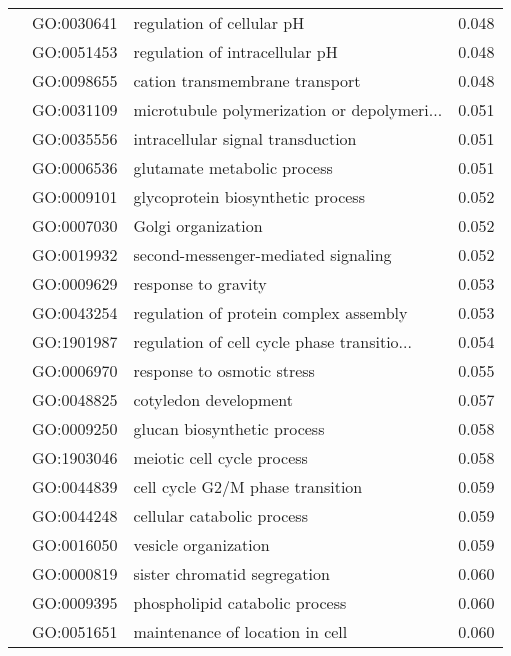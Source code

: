 \begin{longtable}{lllr}
   & GO:0030641 &                    regulation of cellular pH &         0.048 \\
   & GO:0051453 &               regulation of intracellular pH &         0.048 \\
   & GO:0098655 &               cation transmembrane transport &         0.048 \\
   & GO:0031109 &  microtubule polymerization or depolymeri... &         0.051 \\
   & GO:0035556 &            intracellular signal transduction &         0.051 \\
   & GO:0006536 &                  glutamate metabolic process &         0.051 \\
   & GO:0009101 &            glycoprotein biosynthetic process &         0.052 \\
   & GO:0007030 &                           Golgi organization &         0.052 \\
   & GO:0019932 &          second-messenger-mediated signaling &         0.052 \\
   & GO:0009629 &                          response to gravity &         0.053 \\
   & GO:0043254 &       regulation of protein complex assembly &         0.053 \\
   & GO:1901987 &  regulation of cell cycle phase transitio... &         0.054 \\
   & GO:0006970 &                   response to osmotic stress &         0.055 \\
   & GO:0048825 &                        cotyledon development &         0.057 \\
   & GO:0009250 &                  glucan biosynthetic process &         0.058 \\
   & GO:1903046 &                   meiotic cell cycle process &         0.058 \\
   & GO:0044839 &             cell cycle G2/M phase transition &         0.059 \\
   & GO:0044248 &                   cellular catabolic process &         0.059 \\
   & GO:0016050 &                         vesicle organization &         0.059 \\
   & GO:0000819 &                 sister chromatid segregation &         0.060 \\
   & GO:0009395 &               phospholipid catabolic process &         0.060 \\
   & GO:0051651 &              maintenance of location in cell &         0.060 \\

\end{longtable}
